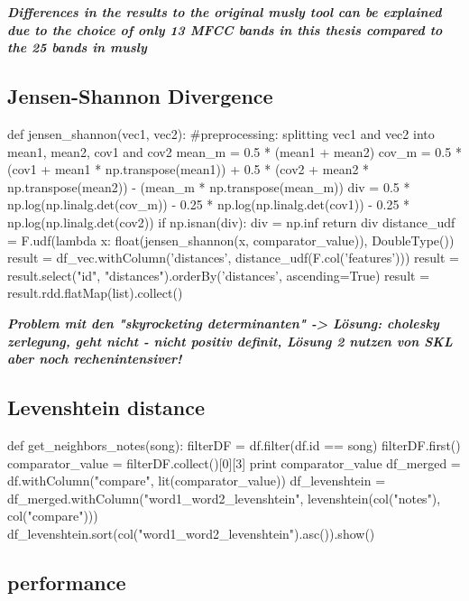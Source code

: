 \noindent\textbf{\textit{Differences in the results to the original musly tool can be explained due to the choice of only 13 MFCC bands in this thesis compared to the 25 bands in musly}\cite{musly1}}

\subsection{Jensen-Shannon Divergence}

\begin{pythonCode}[frame=single,label={lst:js},caption={jensen shannon},captionpos=b]
def jensen_shannon(vec1, vec2):
	#preprocessing: splitting vec1 and vec2 into mean1, mean2, cov1 and cov2
    mean_m = 0.5 * (mean1 + mean2)
    cov_m = 0.5 * (cov1 + mean1 * np.transpose(mean1)) + 0.5 * (cov2 + mean2 * np.transpose(mean2)) - (mean_m * np.transpose(mean_m))
    div = 0.5 * np.log(np.linalg.det(cov_m)) - 0.25 * np.log(np.linalg.det(cov1)) - 0.25 * np.log(np.linalg.det(cov2))  
    if np.isnan(div):
        div = np.inf
    return div
distance_udf = F.udf(lambda x: float(jensen_shannon(x, comparator_value)), DoubleType())
result = df_vec.withColumn('distances', distance_udf(F.col('features')))
result = result.select("id", "distances").orderBy('distances', ascending=True)
result = result.rdd.flatMap(list).collect()
\end{pythonCode}

\noindent\textbf{\textit{Problem mit den "skyrocketing determinanten" -> Lösung: cholesky zerlegung, geht nicht - nicht positiv definit, Lösung 2 nutzen von SKL aber noch rechenintensiver!}\cite[p.45]{schnitzer1}}

\subsection{Levenshtein distance}

\begin{pythonCode}[frame=single,label={lst:lev},caption={levenshtein},captionpos=b]
def get_neighbors_notes(song):
    filterDF = df.filter(df.id == song)
    filterDF.first()
    comparator_value = filterDF.collect()[0][3] 
    print comparator_value
    df_merged = df.withColumn("compare", lit(comparator_value))
    df_levenshtein = df_merged.withColumn("word1_word2_levenshtein", levenshtein(col("notes"), col("compare")))
    df_levenshtein.sort(col("word1_word2_levenshtein").asc()).show()
\end{pythonCode}

\subsection{performance}

